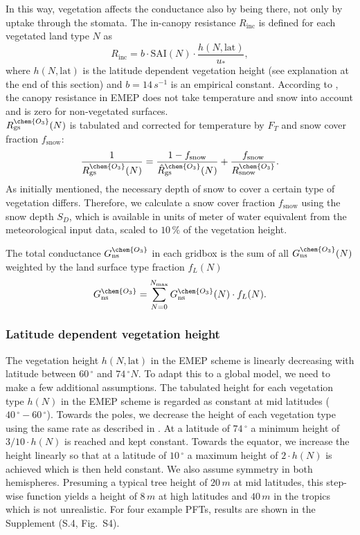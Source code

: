 \documentclass[gmd, manuscript]{copernicus}
\begin{document}
In this way, vegetation affects the conductance also by being there, not only by uptake through the stomata. The in-canopy resistance $R_\text{inc}$ is defined for each vegetated land type $N$ as
\begin{equation}
  R_\text{inc} = b \cdot \text{SAI}(N) \cdot \frac{h(N, \text{lat})}{u_*},
\end{equation}
where $h(N, \text{lat})$ is the latitude dependent vegetation height (see explanation at the end of this section) and $b = 14\,\unit{s^{-1}}$ is an empirical constant. According to \citet{ACP:Simpson2012}, the canopy resistance in EMEP does not take temperature and snow into account and is zero for non-vegetated surfaces.\\
$R_\text{gs}^\chem{O_3}(N)$ is tabulated and corrected for temperature by $F_T$ and snow cover fraction $f_\text{snow}$:
\begin{equation}
  \frac{1}{R_\text{gs}^\chem{O_3}(N)} = \frac{1-f_\text{snow}}{\hat{R}_\text{gs}^\chem{O_3}(N)} + \frac{f_\text{snow}}{R_\text{snow}^\chem{O_3}}.
\end{equation}
As initially mentioned, the necessary depth of snow to cover a certain type of vegetation differs. Therefore, we calculate a snow cover fraction $f_\text{snow}$ using the snow depth $S_D$, which is available in units of meter of water equivalent from the meteorological input data, scaled to $10\,\unit{\%}$ of the vegetation height.

The total conductance $G_\text{ns}^\chem{O_3}$ in each gridbox is the sum of all $G_\text{ns}^\chem{O_3}(N)$ weighted by the land surface type fraction $f_L(N)$
\begin{equation}
  G_\text{ns}^\chem{O_3} = \sum_{N=0}^{N_\text{max}}{G_\text{ns}^\chem{O_3}(N) \cdot f_L(N)}.
\end{equation}

\subsubsection{Latitude dependent vegetation height}
The vegetation height $h(N, \text{lat})$ in the EMEP scheme is linearly decreasing with latitude between $60\,\unit{^\circ}$ and $74\,\unit{^\circ N}$. To adapt this to a global model, we need to make a few additional assumptions. The tabulated height for each vegetation type $h(N)$ in the EMEP scheme is regarded as constant at mid latitudes ($40\,\unit{^\circ}-60\,\unit{^\circ}$). Towards the poles, we decrease the height of each vegetation type using the same rate as described in \citet{ACP:Simpson2012}. At a latitude of $74\,\unit{^\circ}$ a minimum height of $3/10 \cdot h(N)$ is reached and kept constant. Towards the equator, we increase the height linearly so that at a latitude of $10\,\unit{^\circ}$ a maximum height of $2 \cdot h(N)$ is achieved which is then held constant. We also assume symmetry in both hemispheres. Presuming a typical tree height of $20\,\unit{m}$ at mid latitudes, this step-wise function yields a height of $8\,\unit{m}$ at high latitudes and $40\,\unit{m}$ in the tropics which is not unrealistic. For four example PFTs, results are shown in the Supplement (S.4, Fig.~S4). 
\end{document}
